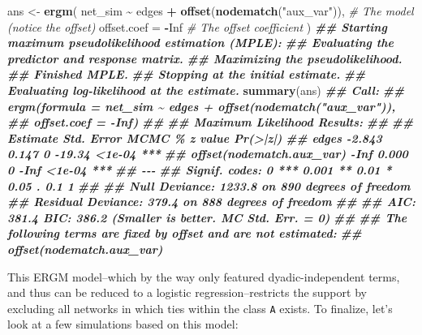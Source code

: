 \documentclass[
]{book}
\newenvironment{Shaded}{\begin{snugshade}}{\end{snugshade}}
\newcommand{\AttributeTok}[1]{\textcolor[rgb]{0.13,0.29,0.53}{#1}}
\newcommand{\CommentTok}[1]{\textcolor[rgb]{0.56,0.35,0.01}{\textit{#1}}}
\newcommand{\ConstantTok}[1]{\textcolor[rgb]{0.56,0.35,0.01}{#1}}
\newcommand{\DocumentationTok}[1]{\textcolor[rgb]{0.56,0.35,0.01}{\textbf{\textit{#1}}}}
\newcommand{\FunctionTok}[1]{\textcolor[rgb]{0.13,0.29,0.53}{\textbf{#1}}}
\newcommand{\NormalTok}[1]{#1}
\newcommand{\OtherTok}[1]{\textcolor[rgb]{0.56,0.35,0.01}{#1}}
\newcommand{\SpecialCharTok}[1]{\textcolor[rgb]{0.81,0.36,0.00}{\textbf{#1}}}
\newcommand{\StringTok}[1]{\textcolor[rgb]{0.31,0.60,0.02}{#1}}
\begin{document}
\begin{Shaded}
\begin{Highlighting}[]
\NormalTok{ans }\OtherTok{\textless{}{-}} \FunctionTok{ergm}\NormalTok{(}
\NormalTok{  net\_sim }\SpecialCharTok{\textasciitilde{}}\NormalTok{ edges }\SpecialCharTok{+} \FunctionTok{offset}\NormalTok{(}\FunctionTok{nodematch}\NormalTok{(}\StringTok{"aux\_var"}\NormalTok{)), }\CommentTok{\# The model (notice the offset)}
  \AttributeTok{offset.coef =} \SpecialCharTok{{-}}\ConstantTok{Inf}                              \CommentTok{\# The offset coefficient}
\NormalTok{  )}
\DocumentationTok{\#\# Starting maximum pseudolikelihood estimation (MPLE):}
\DocumentationTok{\#\# Evaluating the predictor and response matrix.}
\DocumentationTok{\#\# Maximizing the pseudolikelihood.}
\DocumentationTok{\#\# Finished MPLE.}
\DocumentationTok{\#\# Stopping at the initial estimate.}
\DocumentationTok{\#\# Evaluating log{-}likelihood at the estimate.}
\FunctionTok{summary}\NormalTok{(ans)}
\DocumentationTok{\#\# Call:}
\DocumentationTok{\#\# ergm(formula = net\_sim \textasciitilde{} edges + offset(nodematch("aux\_var")), }
\DocumentationTok{\#\#     offset.coef = {-}Inf)}
\DocumentationTok{\#\# }
\DocumentationTok{\#\# Maximum Likelihood Results:}
\DocumentationTok{\#\# }
\DocumentationTok{\#\#                           Estimate Std. Error MCMC \% z value Pr(\textgreater{}|z|)    }
\DocumentationTok{\#\# edges                       {-}2.843      0.147      0  {-}19.34   \textless{}1e{-}04 ***}
\DocumentationTok{\#\# offset(nodematch.aux\_var)     {-}Inf      0.000      0    {-}Inf   \textless{}1e{-}04 ***}
\DocumentationTok{\#\# {-}{-}{-}}
\DocumentationTok{\#\# Signif. codes:  0 \textquotesingle{}***\textquotesingle{} 0.001 \textquotesingle{}**\textquotesingle{} 0.01 \textquotesingle{}*\textquotesingle{} 0.05 \textquotesingle{}.\textquotesingle{} 0.1 \textquotesingle{} \textquotesingle{} 1}
\DocumentationTok{\#\# }
\DocumentationTok{\#\#      Null Deviance: 1233.8  on 890  degrees of freedom}
\DocumentationTok{\#\#  Residual Deviance:  379.4  on 888  degrees of freedom}
\DocumentationTok{\#\#  }
\DocumentationTok{\#\# AIC: 381.4  BIC: 386.2  (Smaller is better. MC Std. Err. = 0)}
\DocumentationTok{\#\# }
\DocumentationTok{\#\#  The following terms are fixed by offset and are not estimated:}
\DocumentationTok{\#\#   offset(nodematch.aux\_var)}
\end{Highlighting}
\end{Shaded}

This ERGM model--which by the way only featured dyadic-independent terms, and thus can be reduced to a logistic regression--restricts the support by excluding all networks in which ties within the class \texttt{A} exists. To finalize, let's look at a few simulations based on this model:
\end{document}
